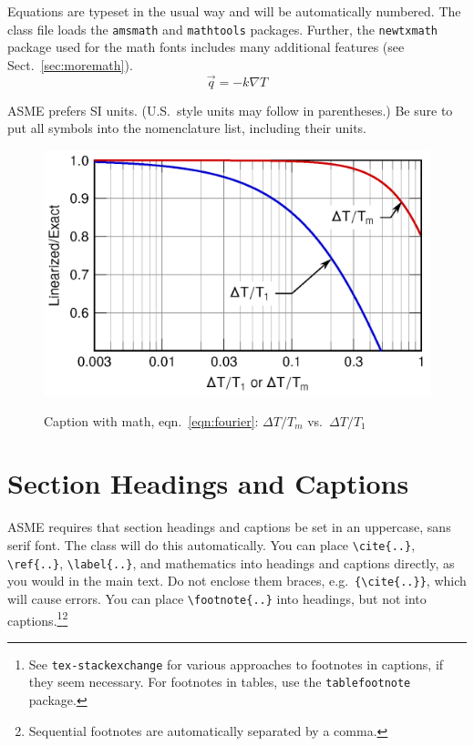 \documentclass[captionpatch,colorlinks,upint,subscriptcorrection,varvw,german]{asmeconf}
\begin{document}
Equations are typeset in the usual way and will be automatically numbered.  The class file loads the \texttt{amsmath} and \texttt{mathtools} packages. Further, the \texttt{newtxmath} package used for the math fonts includes many additional features (see Sect.~\ref{sec:moremath}).
\begin{equation}\label{eqn:fourier}
\vec{q} = -k\nabla T
\end{equation}

ASME prefers SI units. (U.S.\ style units may follow in parentheses.) Be sure to put all symbols into the nomenclature list, including their units.




\begin{figure}
\centering\includegraphics[width=\linewidth, alt = {Linearization error in radiant flux}]{sample-figure-1.png}
\caption{Caption with math, eqn.~\eqref{eqn:fourier}: $\Delta T/T_m$ vs.\ $\Delta T/T_1$~\cite{Lienhard2019}}\label{fig:1}
\end{figure}
 




\section{Section Headings and Captions}

ASME requires that section headings and captions be set in an uppercase, sans serif font.  The class will do this automatically.  You can place \verb|\cite{..}|, \verb|\ref{..}|, \verb|\label{..}|, and mathematics into headings and captions directly, as you would in the main text. Do not enclose them braces, e.g.\ \verb|{\cite{..}}|, which will cause errors. You can place \verb|\footnote{..}| into headings, but not into captions.\footnote{See \texttt{tex-stackexchange} for various approaches to footnotes in captions, if they seem necessary. For footnotes in tables, use the \texttt{tablefootnote} package.}\footnote{Sequential footnotes are automatically separated by a comma.}
\end{document}
